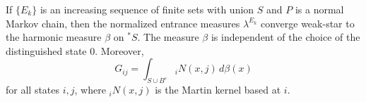 If $\{E_k\}$ is an increasing sequence of finite sets with union $S$ and $P$ is a normal Markov chain, then the normalized entrance measures $\lambda^{E_k}$ converge weak-star to the harmonic measure $\beta$ on ${}^*S$. The measure $\beta$ is independent of the choice of the distinguished state $0$. Moreover,
$$G_{ij} = \int_{S \cup B^e} {}_iN(x, j) \, d\beta(x)$$
for all states $i, j$, where ${}_iN(x, j)$ is the Martin kernel based at $i$.
